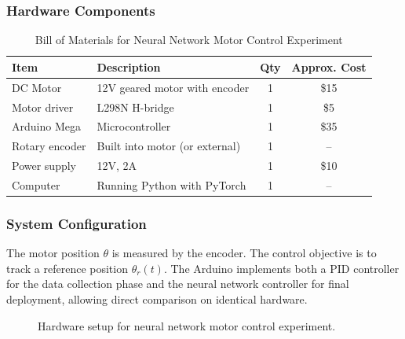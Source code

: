 \subsubsection{Hardware Components}

\begin{table}[htbp]
\centering
\caption{Bill of Materials for Neural Network Motor Control Experiment}
\label{tab:nn_bom}
\begin{tabular}{llcc}
\toprule
\textbf{Item} & \textbf{Description} & \textbf{Qty} & \textbf{Approx. Cost} \\
\midrule
DC Motor & 12V geared motor with encoder & 1 & \$15 \\
Motor driver & L298N H-bridge & 1 & \$5 \\
Arduino Mega & Microcontroller & 1 & \$35 \\
Rotary encoder & Built into motor (or external) & 1 & -- \\
Power supply & 12V, 2A & 1 & \$10 \\
Computer & Running Python with PyTorch & 1 & -- \\
\bottomrule
\end{tabular}
\end{table}

\subsubsection{System Configuration}

The motor position $\theta$ is measured by the encoder. The control objective is to track a reference position $\theta_r(t)$. The Arduino implements both a PID controller for the data collection phase and the neural network controller for final deployment, allowing direct comparison on identical hardware.

\begin{figure}[htbp]
\centering
{}
\caption{Hardware setup for neural network motor control experiment.}
\label{fig:nn_hardware}
\end{figure}

